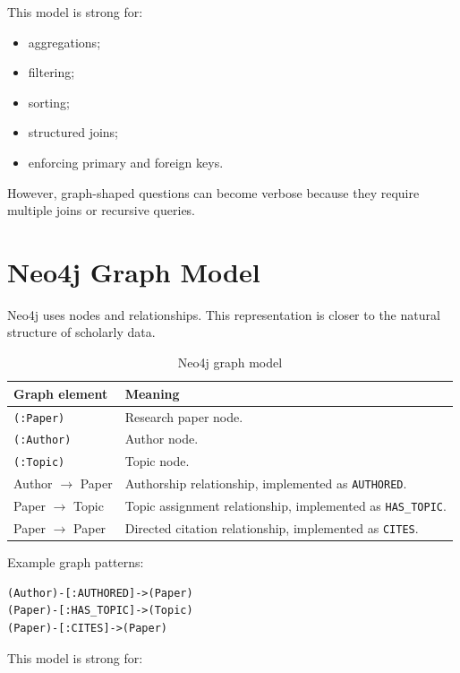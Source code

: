 \documentclass[11pt]{article}
\begin{document}
This model is strong for:

\begin{itemize}
    \item aggregations;
    \item filtering;
    \item sorting;
    \item structured joins;
    \item enforcing primary and foreign keys.
\end{itemize}

However, graph-shaped questions can become verbose because they require multiple joins or recursive queries.

\section{Neo4j Graph Model}

Neo4j uses nodes and relationships.
This representation is closer to the natural structure of scholarly data.

\begin{table}[h]
\centering
\caption{Neo4j graph model}
\label{tab:neo4j-model}
\small
\begin{tabular}{|p{}|p{}|}
\hline
\textbf{Graph element} & \textbf{Meaning} \\
\hline
\texttt{(:Paper)} & Research paper node. \\
\hline
\texttt{(:Author)} & Author node. \\
\hline
\texttt{(:Topic)} & Topic node. \\
\hline
Author \(\rightarrow\) Paper & Authorship relationship, implemented as \texttt{AUTHORED}. \\
\hline
Paper \(\rightarrow\) Topic & Topic assignment relationship, implemented as \texttt{HAS\_TOPIC}. \\
\hline
Paper \(\rightarrow\) Paper & Directed citation relationship, implemented as \texttt{CITES}. \\
\hline
\end{tabular}
\normalsize
\end{table}

Example graph patterns:

\begin{verbatim}
(Author)-[:AUTHORED]->(Paper)
(Paper)-[:HAS_TOPIC]->(Topic)
(Paper)-[:CITES]->(Paper)
\end{verbatim}

This model is strong for:
\end{document}
